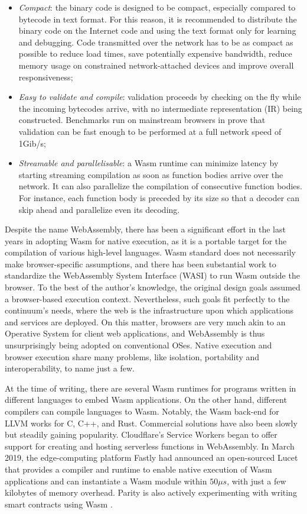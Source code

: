 \begin{itemize}
    \item \emph{Compact}: the binary code is designed to be compact, especially compared to bytecode in text format. For this reason, it is recommended to distribute the binary code on the Internet code and using the text format only for learning and debugging. Code transmitted over the network has to be as compact as possible to reduce load times, save potentially expensive bandwidth, reduce memory usage on constrained network-attached devices and improve overall responsiveness;
    \item \emph{Easy to validate and compile}: validation proceeds by checking on the fly while the incoming bytecodes arrive, with no intermediate representation (IR) being constructed. Benchmarks run on mainstream browsers in \cite{wasm} prove that validation can be fast enough to be performed at a full network speed of 1Gib/s;
    \item \emph{Streamable and parallelisable}: a Wasm runtime can minimize latency by starting streaming compilation as soon as function bodies arrive over the network. It can also parallelize the compilation of consecutive function bodies. For instance, each function body is preceded by its size so that a decoder can skip ahead and parallelize even its decoding.
\end{itemize}

Despite the name WebAssembly, there has been a significant effort in the last years in adopting Wasm for native execution, as it is a portable target for the compilation of various high-level languages. Wasm standard does not necessarily make browser-specific assumptions, and there has been substantial work to standardize the WebAssembly System Interface (WASI) to run Wasm outside the browser. To the best of the author's knowledge, the original design goals assumed a browser-based execution context. Nevertheless, such goals fit perfectly to the continuum's needs, where the web is the infrastructure upon which applications and services are deployed. On this matter, browsers are very much akin to an Operative System for client web applications, and WebAssembly is thus unsurprisingly being adopted on conventional OSes. Native execution and browser execution share many problems, like isolation, portability and interoperability, to name just a few.

At the time of writing, there are several Wasm runtimes for programs written in different languages to embed Wasm applications. On the other hand, different compilers can compile languages to Wasm. Notably, the Wasm back-end for LLVM \cite{llvm} works for C, C++, and Rust. Commercial solutions have also been slowly but steadily gaining popularity. Cloudflare's Service Workers \cite{cloudflare-workers} began to offer support for creating and hosting serverless functions in WebAssembly. In March 2019, the edge-computing platform Fastly had announced an open-sourced Lucet \cite{fastly-lucet} that provides a compiler and runtime to enable native execution of Wasm applications and can instantiate a Wasm module within $50\mu s$, with just a few kilobytes of memory overhead. Parity is also actively experimenting with writing smart contracts using Wasm \cite{parity-wasm}.

